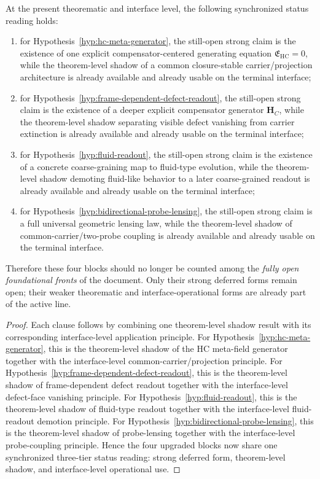 \begin{proposition}
\label{prop:v321-hypothesis-open-question-status-synchronization-principle}
At the present theorematic and interface level, the following synchronized status reading holds:
\begin{enumerate}[leftmargin=2em,label=(\roman*)]
  \item for Hypothesis~\ref{hyp:hc-meta-generator}, the still-open strong claim is the existence of one explicit compensator-centered generating equation $\mathfrak E_{\mathrm{HC}}=0$, while the theorem-level shadow of a common closure-stable carrier/projection architecture is already available and already usable on the terminal interface;
  \item for Hypothesis~\ref{hyp:frame-dependent-defect-readout}, the still-open strong claim is the existence of a deeper explicit compensator generator $\mathbf H_C$, while the theorem-level shadow separating visible defect vanishing from carrier extinction is already available and already usable on the terminal interface;
  \item for Hypothesis~\ref{hyp:fluid-readout}, the still-open strong claim is the existence of a concrete coarse-graining map to fluid-type evolution, while the theorem-level shadow demoting fluid-like behavior to a later coarse-grained readout is already available and already usable on the terminal interface;
  \item for Hypothesis~\ref{hyp:bidirectional-probe-lensing}, the still-open strong claim is a full universal geometric lensing law, while the theorem-level shadow of common-carrier/two-probe coupling is already available and already usable on the terminal interface.
\end{enumerate}
Therefore these four blocks should no longer be counted among the \emph{fully open foundational fronts} of the document. Only their strong deferred forms remain open; their weaker theorematic and interface-operational forms are already part of the active line.
\end{proposition}

\begin{proof}
Each clause follows by combining one theorem-level shadow result with its corresponding interface-level application principle. For Hypothesis~\ref{hyp:hc-meta-generator}, this is the theorem-level shadow of the HC meta-field generator together with the interface-level common-carrier/projection principle. For Hypothesis~\ref{hyp:frame-dependent-defect-readout}, this is the theorem-level shadow of frame-dependent defect readout together with the interface-level defect-face vanishing principle. For Hypothesis~\ref{hyp:fluid-readout}, this is the theorem-level shadow of fluid-type readout together with the interface-level fluid-readout demotion principle. For Hypothesis~\ref{hyp:bidirectional-probe-lensing}, this is the theorem-level shadow of probe-lensing together with the interface-level probe-coupling principle. Hence the four upgraded blocks now share one synchronized three-tier status reading: strong deferred form, theorem-level shadow, and interface-level operational use.
\end{proof}

